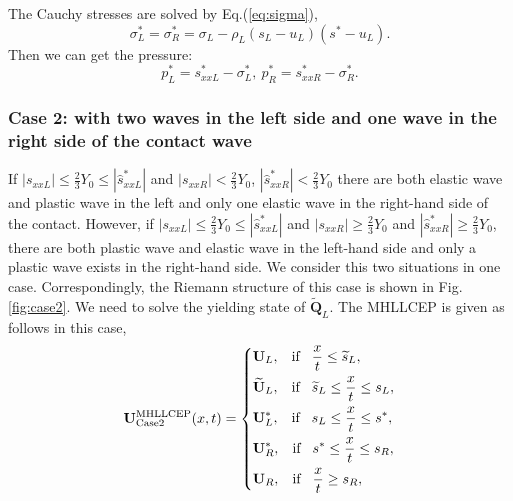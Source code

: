 \documentclass[review]{elsarticle}
\begin{document}
 The Cauchy stresses are solved  by Eq.(\ref{eq:sigma}),
\begin{equation*}
  \sigma_L^*=\sigma_R^*=\sigma_L -\rho_L (s_L-u_L)(s^*-u_L).
\end{equation*}
 Then we can get the pressure: %
\begin{equation}
  p_L^* = s_{xxL}^* - \sigma_L^*,  \  p_R^* = s_{xxR}^* - \sigma_R^*.
\end{equation}

 \subsubsection{Case 2:  with  two waves in the left side and one wave in the right side of the contact wave}\label{sec:case2}
If  $|s_{xxL}| \le \frac{2}{3}Y_0 \le  |\hat{s}_{xxL}^*|$ and $|s_{xxR}|<\frac{2}{3}Y_0$, $|\hat{s}_{xxR}^*| < \frac{2}{3}Y_0$ there are both elastic wave and plastic wave in the left and only one elastic wave in the right-hand side of the contact.  However, if  $|s_{xxL}| \le \frac{2}{3}Y_0 \le  |\hat{s}_{xxL}^*|$ and  $|s_{xxR}|\geq \frac{2}{3}Y_0$ and $|\hat{s}_{xxR}^*| \geq \frac{2}{3}Y_0$, there are both plastic wave and elastic wave in the left-hand side and only a plastic wave exists in the right-hand side.  We consider this two situations in one case. Correspondingly, the Riemann structure of this case is shown in Fig.\ref{fig:case2}. We need to solve the yielding state of $\widetilde{\mathbf{Q}}_L$. The MHLLCEP is given as follows in this case,
 \begin{equation}\label{eq:HLLCEP2}
   \mathbf{U}^{\text{MHLLCEP}}_{\text{Case2}}(x,t) = \left\{ \begin{aligned}
       & \mathbf{U}_L, \hspace{0.3cm} \text{if} \hspace{0.3cm} \frac{x}{t}\le \widetilde{s}_L, \\
        &  \widetilde{\mathbf{U}}_L, \hspace{0.3cm} \text{if} \hspace{0.3cm} \widetilde{s}_L\le \frac{x}{t} \le  s_L, \\
        &\mathbf{U}_L^*, \hspace{0.3cm} \text{if} \hspace{0.3cm} s_L\le \frac{x}{t} \le s^*, \\
        & \mathbf{U}_R^*, \hspace{0.3cm} \text{if} \hspace{0.3cm} s^*\le \frac{x}{t} \le s_R,\\
        & \mathbf{U}_R, \hspace{0.3cm} \text{if} \hspace{0.3cm} \frac{x}{t}\ge s_R, \\
      \end{aligned}
    \right.
  \end{equation}
\end{document}
